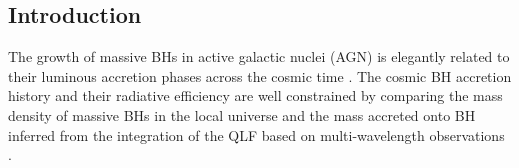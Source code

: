 \documentclass[twocolumn, twocolappendix]{aastex63}
\begin{document}
\begin{CJK*}{UTF8}{gbsn}


\vspace{5mm}
\section{Introduction} \label{sec:intro}
The growth of massive BHs in active galactic nuclei (AGN) is elegantly related to their luminous accretion phases
across the cosmic time \citep{1982MNRAS.200..115S}.
The cosmic BH accretion history and their radiative efficiency are well constrained by 
comparing the mass density of massive BHs in the local universe and the mass accreted onto BH inferred from
the integration of the QLF based on multi-wavelength observations
\citep[e.g.][]{1971ApJ...170..223C,1992MNRAS.259..725S,2002MNRAS.335..965Y,2004MNRAS.351..169M,2008MNRAS.388.1011M,2004MNRAS.354.1020S,
2009ApJ...690...20S,2014MNRAS.439.2736D,2014ApJ...786..104U,2017A&A...600A..64T,2022arXiv220607357S}.


\end{CJK*}
\end{document}
